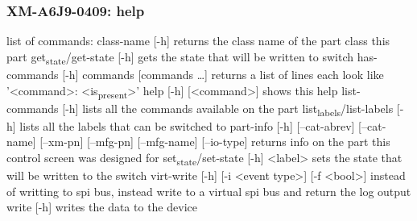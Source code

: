 \documentclass[11pt]{article}
\begin{document}
\subsubsection{XM-A6J9-0409: help}
\label{sec:org0aa60e3}
list of commands:
  class-name [-h]
    returns the class name of the part class this part
  get\textsubscript{state}/get-state [-h]
    gets the state that will be written to switch
  has-commands [-h] commands [commands \ldots{}]
    returns a list of lines each look like '<command>: <is\textsubscript{present}>'
  help [-h] [<command>]
    shows this help
  list-commands [-h]
    lists all the commands available on the part
  list\textsubscript{labels}/list-labels [-h]
    lists all the labels that can be switched to
  part-info  [-h] [--cat-abrev] [--cat-name] [--xm-pn] [--mfg-pn] [--mfg-name]
          [--io-type]
    returns info on the part this control screen was designed for
  set\textsubscript{state}/set-state [-h] <label>
    sets the state that will be written to the switch
  virt-write [-h] [-i <event type>] [-f <bool>]
    instead of writting to spi bus, instead write to a virtual spi bus
    and return the log output
  write [-h]
    writes the data to the device
\end{document}
